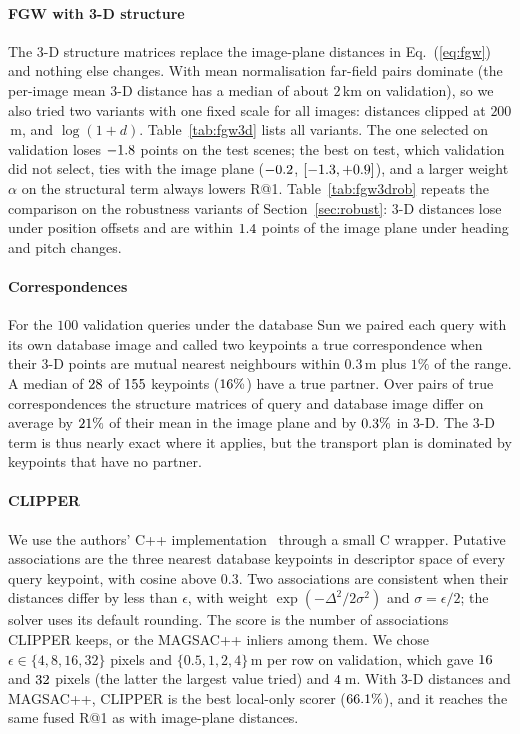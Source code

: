 \documentclass[letterpaper,journal]{IEEEtran}
\begin{document}
\paragraph*{FGW with 3-D structure} The 3-D structure matrices replace the image-plane distances in
Eq.~(\ref{eq:fgw}) and nothing else changes. With mean normalisation far-field pairs dominate (the per-image
mean 3-D distance has a median of about $2$\,km on validation), so we also tried two variants with one
fixed scale for all images: distances clipped at $200$\,m, and $\log(1+d)$.
Table~\ref{tab:fgw3d} lists all variants. The one selected on validation loses $-1.8$ points on the
test scenes; the best on test, which validation did not select, ties with the image plane
($-0.2$, $[-1.3,+0.9]$), and a larger weight
$\alpha$ on the structural term always lowers R@1. Table~\ref{tab:fgw3drob} repeats the comparison on the
robustness variants of Section~\ref{sec:robust}: 3-D distances lose under position offsets and are within
$1.4$ points of the image plane under heading and pitch changes.

\paragraph*{Correspondences} For the $100$ validation queries under the database Sun we paired each query
with its own database image and called two keypoints a true correspondence when their 3-D points are mutual
nearest neighbours within $0.3$\,m plus $1\%$ of the range. A median of $28$ of $155$ keypoints
($16\%$) have a true partner. Over pairs of true correspondences the structure matrices of query
and database image differ on average by $21\%$ of their mean in the image plane and by
$0.3\%$ in 3-D. The 3-D term is thus nearly exact where it applies, but the transport plan is
dominated by keypoints that have no partner.

\paragraph*{CLIPPER} We use the authors' C++ implementation~\cite{lusk2021clipper} through a small C
wrapper. Putative associations are the three nearest database keypoints in descriptor space of every
query keypoint, with cosine above $0.3$. Two associations are consistent when their distances differ by less
than $\epsilon$, with weight $\exp(-\Delta^2/2\sigma^2)$ and $\sigma=\epsilon/2$; the solver uses its default
rounding. The score is the number of associations CLIPPER keeps, or the MAGSAC++ inliers among them. We chose
$\epsilon\in\{4,8,16,32\}$ pixels and $\{0.5,1,2,4\}$\,m per row on validation, which gave $16$ and
$32$ pixels (the latter the largest value tried) and $4$\,m. With 3-D distances and
MAGSAC++, CLIPPER is the best local-only scorer ($66.1\%$), and it reaches the same fused R@1
as with image-plane distances.
\end{document}
